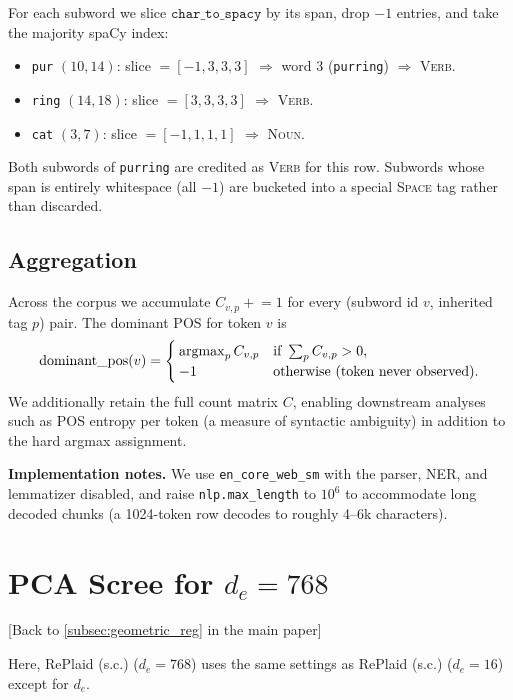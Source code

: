 \documentclass{article}
\begin{document}
For each subword we slice $\mathtt{char\_to\_spacy}$ by its span, drop $-1$
entries, and take the majority spaCy index:

\begin{itemize}
    \item \texttt{\textvisiblespace pur} $(10,14)$:
        slice $= [-1, 3, 3, 3]$ $\Rightarrow$ word $3$ (\texttt{purring})
        $\Rightarrow$ \textsc{Verb}.
    \item \texttt{ring} $(14,18)$: slice $= [3, 3, 3, 3]$ $\Rightarrow$
        \textsc{Verb}.
    \item \texttt{\textvisiblespace cat} $(3,7)$: slice $= [-1, 1, 1, 1]$
        $\Rightarrow$ \textsc{Noun}.
\end{itemize}

Both subwords of \texttt{purring} are credited as \textsc{Verb} for this row.
Subwords whose span is entirely whitespace (all $-1$) are bucketed into a
special \textsc{Space} tag rather than discarded.

\subsection{Aggregation}

Across the corpus we accumulate
$C_{v,p} \mathrel{+}= 1$ for every (subword id $v$, inherited tag $p$) pair.
The dominant POS for token $v$ is
\[
\mathrm{dominant\_pos}(v) =
\begin{cases}
\operatorname*{argmax}_p C_{v,p} & \text{if } \sum_p C_{v,p} > 0, \\
-1 & \text{otherwise (token never observed).}
\end{cases}
\]
We additionally retain the full count matrix $C$, enabling downstream analyses
such as POS entropy per token (a measure of syntactic ambiguity) in addition to
the hard argmax assignment.

\textbf{Implementation notes.} We use
\texttt{en\_core\_web\_sm} with the parser, NER, and lemmatizer disabled, and
raise \texttt{nlp.max\_length} to $10^6$ to accommodate long decoded chunks
(a 1024-token row decodes to roughly 4--6k characters).

\clearpage

\section{PCA Scree for $d_e=768$}

[Back to \cref{subsec:geometric_reg} in the main paper]

Here, RePlaid (s.c.) ($d_e=768$) uses the same settings as RePlaid (s.c.) ($d_e=16$) except for $d_e$.
\end{document}
